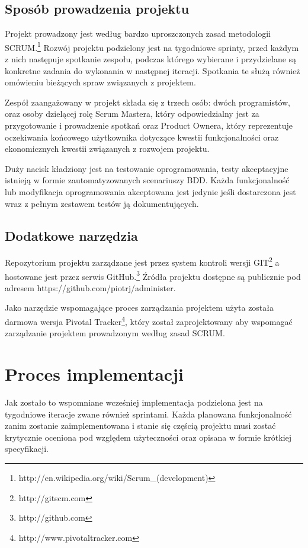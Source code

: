   \subsection{Sposób prowadzenia projektu}
  Projekt prowadzony jest według bardzo uproszczonych zasad metodologii SCRUM.\footnote{http://en.wikipedia.org/wiki/Scrum\_(development)} Rozwój projektu podzielony jest na tygodniowe sprinty, przed każdym z nich następuje spotkanie zespołu, podczas którego wybierane i przydzielane są konkretne zadania do wykonania w następnej iteracji. Spotkania te służą również omówieniu bieżących spraw związanych z projektem.
  
  Zespół zaangażowany w projekt składa się z trzech osób: dwóch programistów, oraz osoby dzielącej rolę Scrum Mastera, który odpowiedzialny jest za przygotowanie i prowadzenie spotkań oraz Product Ownera, który reprezentuje oczekiwania końcowego użytkownika dotyczące kwestii funkcjonalności oraz ekonomicznych kwestii związanych z rozwojem projektu.
  
  Duży nacisk kładziony jest na testowanie oprogramowania, testy akceptacyjne istnieją w formie zautomatyzowanych scenariuszy BDD. Każda funkcjonalność lub modyfikacja oprogramowania akceptowana jest jedynie jeśli dostarczona jest wraz z pełnym zestawem testów ją dokumentujących.
  
  \subsection{Dodatkowe narzędzia}
  Repozytorium projektu zarządzane jest przez system kontroli wersji GIT\footnote{http://git\-scm.com} a hostowane jest przez serwis GitHub.\footnote{http://github.com} Źródła projektu dostępne są publicznie pod adresem https://github.com/piotrj/administer.
  
  Jako narzędzie wspomagające proces zarządzania projektem użyta została darmowa wersja Pivotal Tracker\footnote{http://www.pivotaltracker.com}, który został zaprojektowany aby wspomagać zarządzanie projektem prowadzonym według zasad SCRUM.
  
  \section{Proces implementacji}
  
  Jak zostało to wspomniane wcześniej implementacja podzielona jest na tygodniowe iteracje zwane również sprintami. Każda planowana funkcjonalność zanim zostanie zaimplementowana i stanie się częścią projektu musi zostać krytycznie oceniona pod względem użyteczności oraz opisana w formie krótkiej specyfikacji.
  
